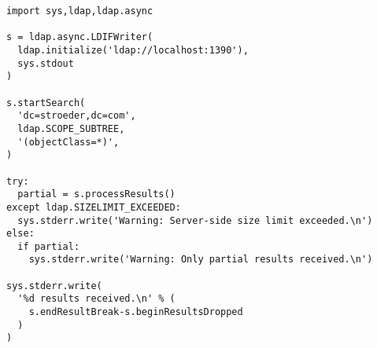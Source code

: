 \begin{verbatim}
import sys,ldap,ldap.async

s = ldap.async.LDIFWriter(
  ldap.initialize('ldap://localhost:1390'),
  sys.stdout
)

s.startSearch(
  'dc=stroeder,dc=com',
  ldap.SCOPE_SUBTREE,
  '(objectClass=*)',
)

try:
  partial = s.processResults()
except ldap.SIZELIMIT_EXCEEDED:
  sys.stderr.write('Warning: Server-side size limit exceeded.\n')
else:
  if partial:
    sys.stderr.write('Warning: Only partial results received.\n')

sys.stderr.write(
  '%d results received.\n' % (
    s.endResultBreak-s.beginResultsDropped
  )
)
\end{verbatim}


